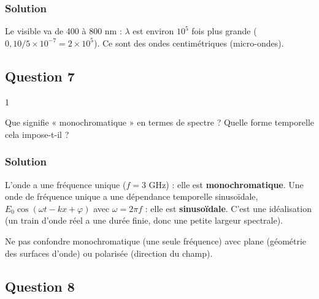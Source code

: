 \documentclass[11pt,a4paper]{article}
\newcommand{\equationajustee}[1]{%
  \sbox{\boiteequation}{$\displaystyle #1$}%
  \ifdim\wd\boiteequation>\linewidth
    \[\resizebox{\linewidth}{!}{\usebox{\boiteequation}}\]%
  \else
    \[#1\]%
  \fi}
\begin{document}
\hypertarget{solution-5}{%
\subsubsection{Solution}\label{solution-5}}

\equationajustee{\begin{aligned}
\lambda&=\frac cf\\
&=\frac{3{,}00\times10^8}{3\times10^9}\\
&=\boxed{0{,}10\ \mathrm m}
\end{aligned}}

Le visible va de 400 à 800 nm : \(\lambda\) est environ \(10^5\) fois plus grande (\(0{,}10/5\times10^{-7}=2\times10^5\)). Ce sont des ondes centimétriques (micro-ondes).

\hypertarget{question-7}{%
\subsection{Question 7}\label{question-7}}

\begin{indication}{1}

Que signifie « monochromatique » en termes de spectre ? Quelle forme temporelle cela impose-t-il ?

\end{indication}

\hypertarget{solution-6}{%
\subsubsection{Solution}\label{solution-6}}

L'onde a une fréquence unique (\(f=3\) GHz) : elle est \textbf{monochromatique}. Une onde de fréquence unique a une dépendance temporelle sinusoïdale, \(E_0\cos(\omega t-kx+\varphi)\) avec \(\omega=2\pi f\) : elle est \textbf{sinusoïdale}. C'est une idéalisation (un train d'onde réel a une durée finie, donc une petite largeur spectrale).

\begin{piege}

Ne pas confondre monochromatique (une seule fréquence) avec plane (géométrie des surfaces d'onde) ou polarisée (direction du champ).

\end{piege}

\hypertarget{question-8}{%
\subsection{Question 8}\label{question-8}}
\end{document}
